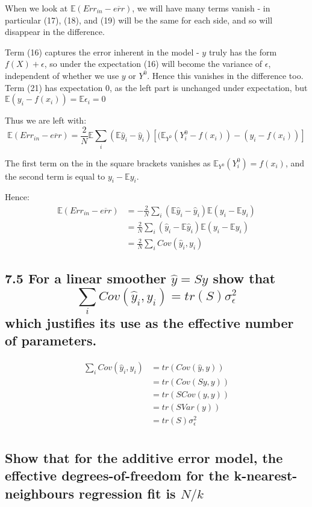 When we look at $\mathbb{E} \left( Err_{in} - \overline{err} \right)$, we will have many terms vanish - in particular (17), (18), and (19) will be the same for each side, and so will disappear in the difference.

Term (16) captures the error inherent in the model - $y$ truly has the form $f(X) + \epsilon$, so under the expectation (16) will become the variance of $\epsilon$, independent of whether we use $y$ or $Y^0$.
Hence this vanishes in the difference too.
Term (21) has expectation $0$, as the left part is unchanged under expectation, but $\mathbb{E}(y_i - f(x_i)) = \mathbb{E}{\epsilon_i} = 0$

Thus we are left with:
$$\mathbb{E} \left( Err_{in} - \overline{err} \right) = \frac{2}{N}\mathbb{E}\sum_i(\mathbb{E}\hat{y}_i - \hat{y}_i)\left[ (\mathbb{E}_{Y^0}( Y^0_i - f(x_i)) - (y_i - f(x_i))\right]$$

The first term on the in the square brackets vanishes as $\mathbb{E}_{Y^0}(Y^0_i) = f(x_i)$, and the second term is equal to $y_i - \mathbb{E}y_i$.

Hence:
\begin{align*}
    \mathbb{E} \left( Err_{in} - \overline{err} \right) &= -\frac{2}{N}\sum_i(\mathbb{E}\hat{y}_i - \hat{y}_i)\mathbb{E} \left(y_i -\mathbb{E} y_i\right) \\
    &= \frac{2}{N}\sum_i(\hat{y}_i - \mathbb{E}\hat{y}_i) \mathbb{E} \left(y_i - \mathbb{E} y_i\right) \\
    &= \frac{2}{N}\sum_i Cov(\hat{y}_i, y_i)
\end{align*}

\subsection*{7.5 For a linear smoother $\hat{y} = Sy$ show that 
$$\sum_i Cov(\hat{y}_i, y_i) = tr(S) \sigma_\epsilon^2$$
which justifies its use as the effective number of parameters.
}

\begin{align*}
    \sum_i Cov(\hat{y}_i, y_i) &= tr(Cov(\hat{y}, y)) \\
     &= tr(Cov(Sy, y)) \\
     &= tr(S Cov(y, y)) \\
     &= tr(S Var(y)) \\
     &= tr(S) \sigma_\epsilon^2\\
\end{align*}

\subsection*{Show that for the additive error model, the effective degrees-of-freedom for the k-nearest-neighbours regression fit is $N/k$}

